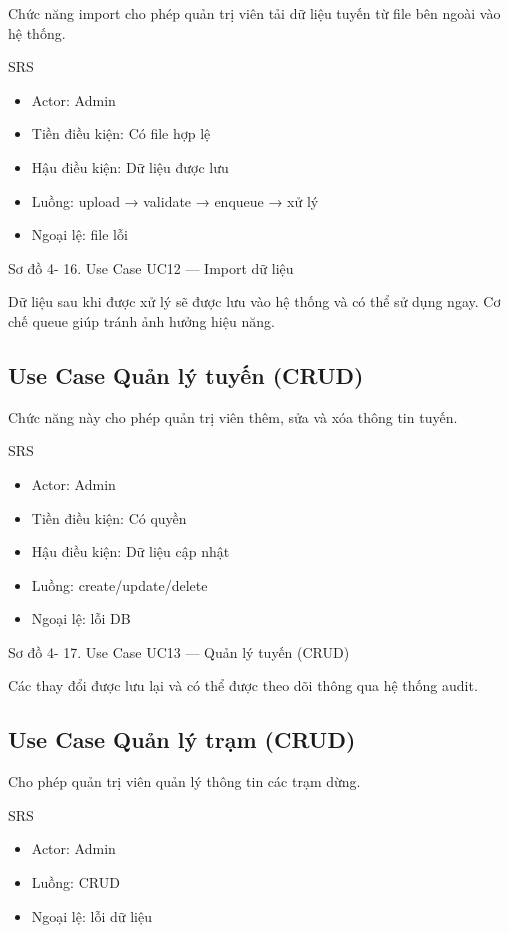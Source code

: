 \documentclass[13pt,a4paper]{report}
\begin{document}
Chức năng import cho phép quản trị viên tải dữ liệu tuyến từ file bên ngoài vào hệ thống.

SRS

\begin{itemize}
    \item Actor: Admin
    \item Tiền điều kiện: Có file hợp lệ
    \item Hậu điều kiện: Dữ liệu được lưu
    \item Luồng: upload → validate → enqueue → xử lý
    \item Ngoại lệ: file lỗi
\end{itemize}

Sơ đồ 4- 16. Use Case UC12 — Import dữ liệu

Dữ liệu sau khi được xử lý sẽ được lưu vào hệ thống và có thể sử dụng ngay. Cơ chế queue giúp tránh ảnh hưởng hiệu năng.

\subsection{Use Case Quản lý tuyến (CRUD)}

Chức năng này cho phép quản trị viên thêm, sửa và xóa thông tin tuyến.

SRS

\begin{itemize}
    \item Actor: Admin
    \item Tiền điều kiện: Có quyền
    \item Hậu điều kiện: Dữ liệu cập nhật
    \item Luồng: create/update/delete
    \item Ngoại lệ: lỗi DB
\end{itemize}

Sơ đồ 4- 17. Use Case UC13 — Quản lý tuyến (CRUD)

Các thay đổi được lưu lại và có thể được theo dõi thông qua hệ thống audit.

\subsection{Use Case Quản lý trạm (CRUD)}

Cho phép quản trị viên quản lý thông tin các trạm dừng.

SRS

\begin{itemize}
    \item Actor: Admin
    \item Luồng: CRUD
    \item Ngoại lệ: lỗi dữ liệu
\end{itemize}
\end{document}
